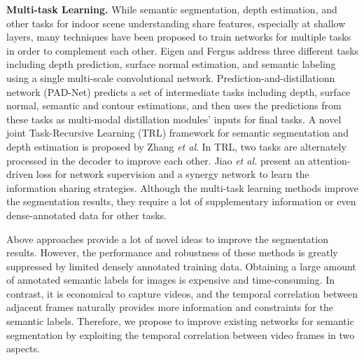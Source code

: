  
\noindent \textbf{Multi-task Learning.} 
%
While semantic segmentation, depth estimation, and other tasks for indoor scene understanding share features, especially at shallow layers, many techniques have been proposed to train networks for multiple tasks in order to complement each other.
%
Eigen and Fergus \cite{Eigen2015} address three different tasks including depth prediction, surface normal estimation, and semantic labeling using a single multi-scale convolutional network. 
%
Prediction-and-distillationn network (PAD-Net)\cite{Xu2018} predicts a set of intermediate tasks including depth, surface normal, semantic and contour estimations, and then uses the predictions from these tasks as multi-modal distillation modules' inputs for final tasks.  
%
A novel joint Task-Recursive Learning (TRL) \cite{Zhang2018} framework for semantic segmentation and depth estimation is proposed by Zhang \emph{et al}. 
%
In TRL, two tasks are alternately processed in the decoder to improve each other.
% 
Jiao \emph{et al.} \cite{Jiao2018} present an attention-driven loss for network supervision and a synergy network to learn the information sharing strategies. 
%
%
Although the multi-task learning methods improve the segmentation results, they require a lot of supplementary information or even dense-annotated data for other tasks.

Above approaches provide a lot of novel ideas to improve the segmentation results. However, the performance and robustness of these methods is greatly suppressed by limited densely annotated training data.
%
Obtaining a large amount of annotated semantic labels for images is expensive and time-consuming.
%
In contrast, it is economical to capture videos, and the temporal correlation between adjacent frames naturally provides more information and constraints for the semantic labels. 
%
Therefore, we propose to improve existing networks for semantic segmentation by exploiting the temporal correlation between video frames in two aspects.

